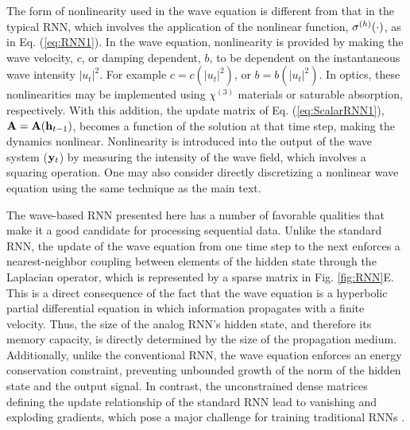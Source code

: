 The form of nonlinearity used in the wave equation is different from that in the typical RNN, which involves the application of the nonlinear function, $\sigma^{(h)}(\cdot)$, as in Eq. (\ref{eq:RNN1}).  In the wave equation, nonlinearity is provided by making the wave velocity, $c$, or damping dependent, $b$, to be dependent on the instantaneous wave intensity $|u_t|^2$.  For example $c = c(|u_t|^2)$, or $b = b(|u_t|^2)$.  In optics, these nonlinearities may be implemented using $\chi^{(3)}$ materials or saturable absorption, respectively.  With this addition, the update matrix of Eq. (\ref{eq:ScalarRNN1}), $\mathbf{A} = \mathbf{A}(\mathbf{h}_{t-1})$, becomes a function of the solution at that time step, making the dynamics nonlinear.  Nonlinearity is introduced into the  output of the wave system ($\mathbf{y}_t$) by measuring the intensity of the wave field, which involves a squaring operation.  One may also consider directly discretizing a nonlinear wave equation using the same technique as the main text.

The wave-based RNN presented here has a number of favorable qualities that make it a good candidate for processing sequential data.
Unlike the standard RNN, the update of the wave equation from one time step to the next enforces a nearest-neighbor coupling between elements of the hidden state through the Laplacian operator, which is represented by a sparse matrix in Fig. \ref{fig:RNN}E. 
This is a direct consequence of the fact that the wave equation is a hyperbolic partial differential equation in which information propagates with a finite velocity. 
Thus, the size of the analog RNN's hidden state, and therefore its memory capacity, is directly determined by the size of the propagation medium. 
Additionally, unlike the conventional RNN, the wave equation enforces an energy conservation constraint, preventing unbounded growth of the norm of the hidden state and the output signal.
In contrast, the unconstrained dense matrices defining the update relationship of the standard RNN lead to vanishing and exploding gradients, which pose a major challenge for training traditional RNNs \cite{jing2017tunable}.

